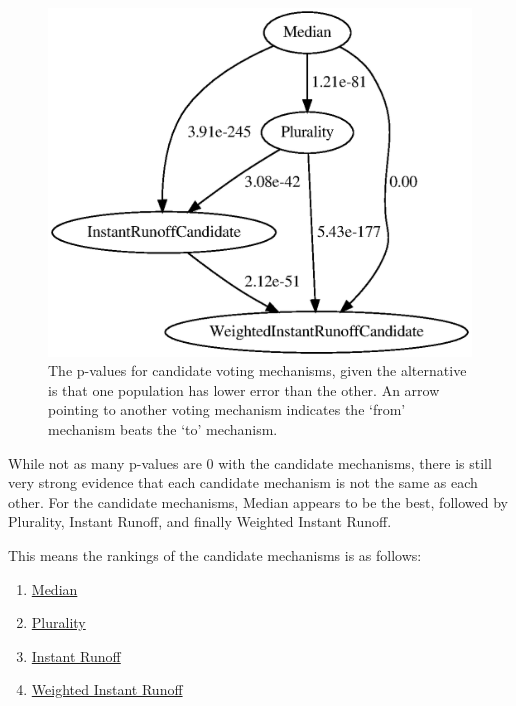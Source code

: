 \begin{figure}[htbp]
    \centering
    \includegraphics[scale=0.75]
    {./content/figures/voting_mechanisms/candidate-mechanisms-p-values.gv}
    \caption{The p-values for candidate voting mechanisms, given the alternative is
    that one population has lower error than the other.
    An arrow pointing to another voting mechanism indicates the `from' mechanism
    beats the `to' mechanism.}
    \label{fig:candidate-mechanisms-p-values}
\end{figure}

While not as many p-values are 0 with the candidate mechanisms, there is still very
strong evidence that each candidate mechanism is not the same as each other.
For the candidate mechanisms, Median appears to be the best, followed
by Plurality, Instant Runoff, and finally Weighted Instant Runoff.
\begin{samepage}
    This means the rankings of the candidate mechanisms is as follows:
    \begin{enumerate}
        \item \hyperref[para:median]{Median}
        \item \hyperref[para:plurality]{Plurality}
        \item \hyperref[para:cand-instant-runoff]{Instant Runoff}
        \item \hyperref[para:cand-weighted-instant-runoff]{Weighted Instant Runoff}
    \end{enumerate}
\end{samepage}


